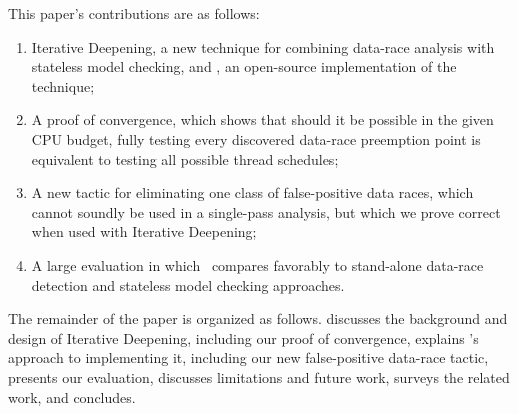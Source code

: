 This paper's contributions are as follows:
\begin{enumerate}
	\item Iterative Deepening, a new technique for combining data-race analysis with stateless model checking, and \quicksand, an open-source implementation of the technique;
	\item A proof of convergence, which shows that should it be possible in the given CPU budget,
		fully testing every discovered data-race preemption point is equivalent to testing all possible thread schedules;
	\item A new tactic for eliminating one class of false-positive data races,
		which cannot soundly be used in a single-pass analysis,
		but which we prove correct when used with Iterative Deepening;
	\item A large evaluation in which \quicksand~compares favorably to stand-alone data-race detection and stateless model checking approaches.
\end{enumerate}

The remainder of the paper is organized as follows.
\sect{\ref{sec:design}} discusses the background and design of Iterative Deepening, including our proof of convergence,
\sect{\ref{sec:implementation}} explains \quicksand's approach to implementing it, including our new false-positive data-race tactic,
\sect{\ref{sec:eval}} presents our evaluation,
\sect{\ref{sec:future}} discusses limitations and future work,
\sect{\ref{sec:related}} surveys the related work,
and \sect{\ref{sec:conclusion}} concludes.
